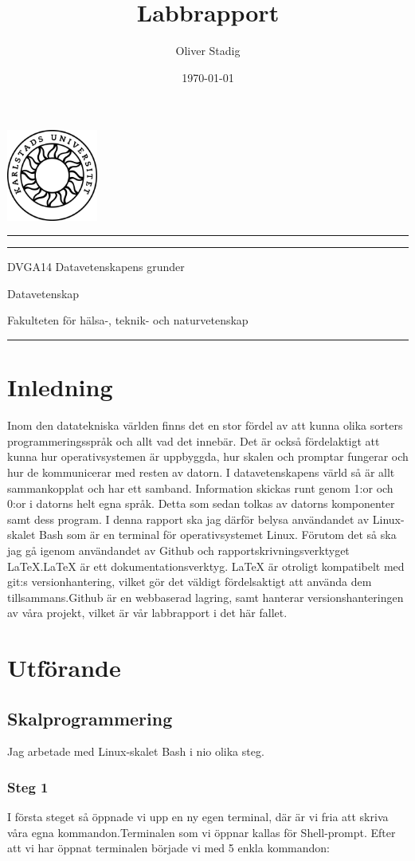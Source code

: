 \documentclass[12pt, a4paper, openright]{article}
\title{Labbrapport}
\author{Oliver Stadig}
\date{\today}
\makeatletter
\renewcommand{\maketitle}{\bgroup\setlength{\parindent}{0pt}
\begin{flushleft}



\vspace*{-4cm} 
\noindent\includegraphics[width=3cm]{kaulogo.jpg}
\vspace{2cm} 

  \hrule\vspace{0.5cm}
  \textbf{\Huge\@title}
  \vspace{0.5cm}\hrule
  
  \vspace{0.5cm}
  \@author
  
  \vspace{0.5cm}
  \@date
  
\vspace{0.5cm}
  DVGA14 Datavetenskapens grunder
  
  Datavetenskap
  
  Fakulteten för hälsa-, teknik- och naturvetenskap
  \vspace{0.5cm}\hrule

\end{flushleft}\egroup
}
\makeatother
\begin{document}
\maketitle  

\tableofcontents  

\newpage

\section{Inledning}


\noindent
Inom den datatekniska världen finns det en stor fördel av att kunna olika sorters programmeringsspråk och allt vad det innebär. Det är också fördelaktigt att kunna hur operativsystemen är uppbyggda, hur skalen och promptar fungerar och hur de kommunicerar med resten av datorn.  I datavetenskapens värld så är allt sammankopplat och har ett samband. Information skickas runt genom 1:or och 0:or i datorns helt egna språk. Detta som sedan tolkas av datorns komponenter samt dess program. I denna rapport ska jag därför belysa användandet av Linux-skalet Bash som är en terminal för operativsystemet Linux. Förutom det så ska jag gå igenom användandet av Github och rapportskrivningsverktyget LaTeX.LaTeX är ett dokumentationsverktyg. LaTeX är otroligt kompatibelt med git:s versionhantering, vilket gör det väldigt fördelsaktigt att använda dem tillsammans.Github är en webbaserad lagring, samt hanterar versionshanteringen av våra projekt, vilket är vår labbrapport i det här fallet.

\newpage

\section{Utförande}

\subsection{Skalprogrammering}
Jag arbetade med Linux-skalet Bash i nio olika steg. 

\subsubsection{Steg 1}

I första steget så öppnade vi upp en ny egen terminal, där är vi fria att skriva våra egna kommandon.Terminalen som vi öppnar kallas för Shell-prompt. Efter att vi har öppnat terminalen började vi med 5 enkla kommandon:
\end{document}
